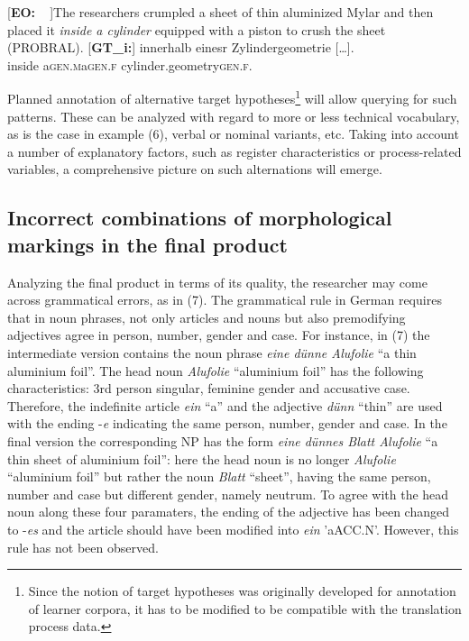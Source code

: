 \documentclass[output=paper]{LSP/langsci}
\begin{document}
\ea
\begin{xlist}
\exi{}[\textbf{EO:~~}]{The researchers crumpled a sheet of thin aluminized Mylar and then placed it \emph{inside a cylinder} equipped with a piston to crush the sheet (PROBRAL).}
\exi{}[\textbf{GT\_i:}]{
\gll [...] innerhalb\raute{} eines\stern\raute\stern\stern\stern\stern\pfeil\pfeil{}r\raute{}  Z\stern{}ylindergeometrie [\dots].\\
{} inside a\textsc{gen.m}\stern\raute\stern\stern\stern\stern{}a\textsc{gen.f} cylinder.geometry\textsc{gen.f}.\\}
\end{xlist}
\z

Planned annotation of alternative target hypotheses\footnote{Since the notion of target hypotheses was originally developed for annotation of learner corpora, it has to be modified to be compatible with the translation process data.}  will allow querying for such patterns. These can be analyzed with regard to more or less technical vocabulary, as is the case in example (6), verbal or nominal variants, etc. Taking into account a number of explanatory factors, such as register characteristics or process-related variables, a comprehensive picture on such alternations will emerge. 

\subsection{Incorrect combinations of morphological markings in the final product}
Analyzing the final product in terms of its quality, the researcher may come across grammatical errors, as in (7). The grammatical rule in German requires that in noun phrases, not only articles and nouns but also premodifying adjectives agree in person, number, gender and case. For instance, in (7) the intermediate version contains the noun phrase \textit{eine dünne Alufolie} “a thin aluminium foil”. The head noun \textit{Alufolie} “aluminium foil” has the following characteristics: 3rd person singular, feminine gender and accusative case. Therefore, the indefinite article \textit{ein} “a” and the adjective \textit{dünn} “thin” are used with the ending -\textit{e} indicating the same person, number, gender and case. In the final version the corresponding NP has the form \textit{eine dünnes Blatt Alufolie} “a thin sheet of aluminium foil”: here the head noun is no longer \textit{Alufolie} “aluminium foil” but rather the noun \textit{Blatt} “sheet”, having the same person, number and case but different gender, namely neutrum. To agree with the head noun along these four paramaters, the ending of the adjective has been changed to -\textit{es} and the article should have been modified into \textit{ein} 'a{\tiny ACC.N}'. However, this rule has not been observed.
\end{document}
